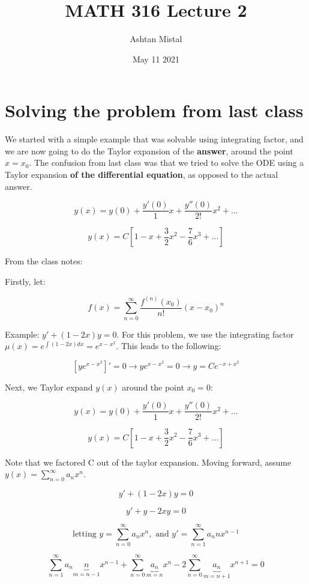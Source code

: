 \documentclass{article}
\title{MATH 316 Lecture 2}
\author{Ashtan Mistal}
\date{May 11 2021}
\begin{document}
\ifstandalone
\maketitle
\fi

\graphicspath{{./Lecture02/}}

\section{Solving the problem from last class}

We started with a simple example that was solvable using integrating factor, and we are now going to do the Taylor expansion of the \textbf{answer}, around the point $x = x_0$. The confusion from last class was that we tried to solve the ODE using a Taylor expansion \textbf{of the differential equation}, as opposed to the actual answer. 

$$y(x) = y(0) + \frac{y'(0)}{1} x + \frac{y''(0)}{2!} x^2 + ...$$

$$y(x) = C \left[1 - x + \frac{3}{2} x^2 - \frac{7}{6} x^3 + ... \right]$$

From the class notes:


Firstly, let:

$$f(x) = \sum_{n = 0}^\infty \frac{f^{(n)} (x_0)}{n!} (x - x_0)^n$$

Example: $y' + (1-2x) y = 0$. For this problem, we use the integrating factor $\mu(x) = e^{\int (1-2x) dx} = e^{x - x^2}$. This leads to the following:

$$\left[ y e^{x - x^2} \right]' = 0 \to y e^{x - x^2} = 0 \to y = C e^{-x + x^2}$$

Next, we Taylor expand $y(x)$ around the point $x_0 = 0$:

$$y(x) = y(0) + \frac{y'(0)}{1} x + \frac{y''(0)}{2!} x^2 + ...$$

$$y(x) = C \left[ 1-x+\frac{3}{2} x^2 - \frac{7}{6} x^3 + ... \right]$$


Note that we factored C out of the taylor expansion. Moving forward, assume $y(x) = \sum_{n = 0}^{\infty} a_n x^n$. 

$$y' + (1 - 2x) y = 0$$

$$y' + y - 2xy = 0$$

$$\text{letting } y = \sum_{n = 0}^{\infty} a_n x^n, \text{ and } y' = \sum_{n = 1}^{\infty} a_n n x^{n-1}$$

$$\sum_{n = 1}^{\infty} a_n \underbrace{n}_{m = n-1} x^{n-1} + \sum_{n = 0}^{\infty} \underbrace{a_n}_{m = n} x^n - 2 \sum_{n = 0}^{\infty} \underbrace{a_n}_{m = n+1} x^{n+1} = 0$$
\end{document}
